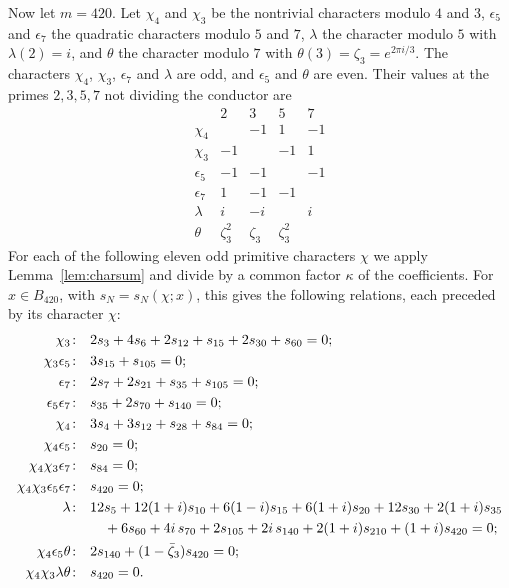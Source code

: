 \documentclass[11pt]{amsart}
\theoremstyle{definition}
\theoremstyle{remark}
\numberwithin{equation}{section}
\begin{document}
Now let $m=420$. Let $\chi_4$ and $\chi_3$ be the nontrivial characters modulo $4$ and $3$, $\epsilon_5$ and $\epsilon_7$ the quadratic characters modulo $5$ and $7$, $\lambda$ the character modulo $5$ with $\lambda(2)=i$, and $\theta$ the character modulo $7$ with $\theta(3)=\zeta_3=e^{2\pi i/3}$. The characters $\chi_4$, $\chi_3$, $\epsilon_7$ and $\lambda$ are odd, and $\epsilon_5$ and $\theta$ are even. Their values at the primes $2,3,5,7$ not dividing the conductor are
\[
\begin{array}{c|cccc}
 & 2 & 3 & 5 & 7\\ \hline
\chi_4 & & -1 & 1 & -1\\
\chi_3 & -1 & & -1 & 1\\
\epsilon_5 & -1 & -1 & & -1\\
\epsilon_7 & 1 & -1 & -1 & \\
\lambda & i & -i & & i\\
\theta & \zeta_3^2 & \zeta_3 & \zeta_3^2 &
\end{array}
\]
For each of the following eleven odd primitive characters $\chi$ we apply Lemma~\ref{lem:charsum} and divide by a common factor $\kappa$ of the coefficients. For $x\in B_{420}$, with $s_N=s_N(\chi;x)$, this gives the following relations, each preceded by its character $\chi$:
\begin{align}
\chi_3\colon\ \ & 2s_3+4s_6+2s_{12}+s_{15}+2s_{30}+s_{60}=0; \label{eq:r1}\\
\chi_3\epsilon_5\colon\ \ & 3s_{15}+s_{105}=0; \label{eq:r2}\\
\epsilon_7\colon\ \ & 2s_7+2s_{21}+s_{35}+s_{105}=0; \label{eq:r3}\\
\epsilon_5\epsilon_7\colon\ \ & s_{35}+2s_{70}+s_{140}=0; \label{eq:r4}\\
\chi_4\colon\ \ & 3s_4+3s_{12}+s_{28}+s_{84}=0; \label{eq:r5}\\
\chi_4\epsilon_5\colon\ \ & s_{20}=0; \label{eq:r6}\\
\chi_4\chi_3\epsilon_7\colon\ \ & s_{84}=0; \label{eq:r7}\\
\chi_4\chi_3\epsilon_5\epsilon_7\colon\ \ & s_{420}=0; \label{eq:r8}\\
\lambda\colon\ \ & 12s_5+12(1+i)s_{10}+6(1-i)s_{15}+6(1+i)s_{20}+12s_{30}+2(1+i)s_{35} \label{eq:r9}\\
&\quad{}+6s_{60}+4i\,s_{70}+2s_{105}+2i\,s_{140}+2(1+i)s_{210}+(1+i)s_{420}=0; \notag\\
\chi_4\epsilon_5\theta\colon\ \ & 2s_{140}+(1-\bar\zeta_3)s_{420}=0; \label{eq:r10}\\
\chi_4\chi_3\lambda\theta\colon\ \ & s_{420}=0. \label{eq:r11}
\end{align}
\end{document}
